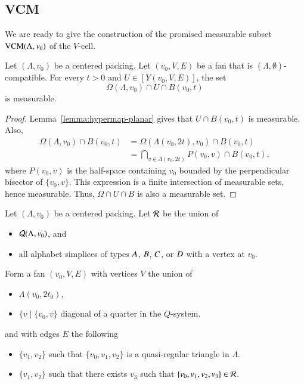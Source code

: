 \subsection{VCM}
\label{sec:VCM}

We are ready to give 
the construction of the promised measurable subset ${\operatorname{VCM}}(\Lambda,v_0)$ of the $V$-cell.


\begin{lemma}
Let $(\Lambda,v_0)$ be a centered packing.  Let $(v_0,V,E)$ be a fan
that is $(\Lambda,\emptyset)$-compatible.  For every $t>0$ and
$U\in[Y(v_0,V,E)]$, the set
  $$
  \Omega(\Lambda,v_0)\cap U \cap B(v_0,t)
  $$
is measurable.
\end{lemma}

\begin{proof}  Lemma~\ref{lemma:hypermap-planar} 
gives that $U\cap B(v_0,t)$ is measurable.
Also,
  $$
  \begin{array}{lll}
  \Omega(\Lambda,v_0)\cap B(v_0,t) &= \Omega(\Lambda(v_0,2t),v_0) 
    \cap B(v_0,t) \\
    &= \bigcap _{v\in\Lambda(v_0,2t)} P(v_0,v) \cap B(v_0,t),
  \end{array}
  $$
where $P(v_0,v)$ is the half-space containing $v_0$ bounded by the
perpendicular bisector of $\{v_0,v\}$.  This expression is a finite
intersection of measurable sets, hence measurable.  Thus, $\Omega\cap U\cap B$ is also a measurable set.
\end{proof}

Let $(\Lambda,v_0)$ be a centered packing.  Let ${\mathcal R}$ be the union of 
\begin{itemize}
  \item ${\mathcal Q}(\Lambda,v_0)$, and
  \item all alphabet simplices of types $A$, $B$, $C$, or $D$ with a vertex at $v_0$.  
\end{itemize}
Form a fan $(v_0,V,E)$ with vertices $V$ the union of
\begin{itemize}
  \item $\Lambda(v_0,2t_0)$,
  \item $\{v \mid \{v_0,v\}$  diagonal of a quarter in the  $Q$-system.
\end{itemize}
and with edges $E$ the following
\begin{itemize}
  \item $\{v_1,v_2\}$ such that $\{v_0,v_1,v_2\}$ is a quasi-regular triangle in $\Lambda$.
  \item $\{v_1,v_2\}$ such that there exists $v_3$ such that $\{v_0,v_1,v_2,v_3\}\in{\mathcal R}$.
\end{itemize}

